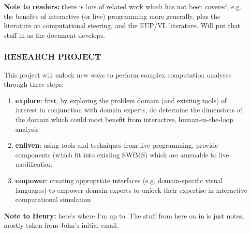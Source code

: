 \documentclass[a4paper]{scrartcl}
\begin{document}
\textbf{Note to readers:} there is lots of related work which has not
been covered, e.g. the benefits of interactive (or live) programming
more generally, plus the literature on computational steering, and the
EUP/VL literature. Will put that stuff in as the document develops.




\subsubsection*{RESEARCH PROJECT}

This project will unlock new ways to perform complex computation
analyses through three steps:

\begin{enumerate}
\item \textbf{explore}: first, by exploring the problem domain (and
  existing tools) of interest in conjunction with domain experts, do
  determine the dimensions of the domain which could most benefit from
  interactive, human-in-the-loop analysis
\item \textbf{enliven}: using tools and techniques from live
  programming, provide components (which fit into existing SWfMS)
  which are amenable to live modification
\item \textbf{empower}: creating appropriate interfaces (e.g.
  domain-specific visual languages) to empower domain experts to
  unlock their expertise in interactive computational simulation
\end{enumerate}

\textbf{Note to Henry:} here's where I'm up to. The stuff from here on
in is just notes, mostly taken from John's initial email.



\end{document}
